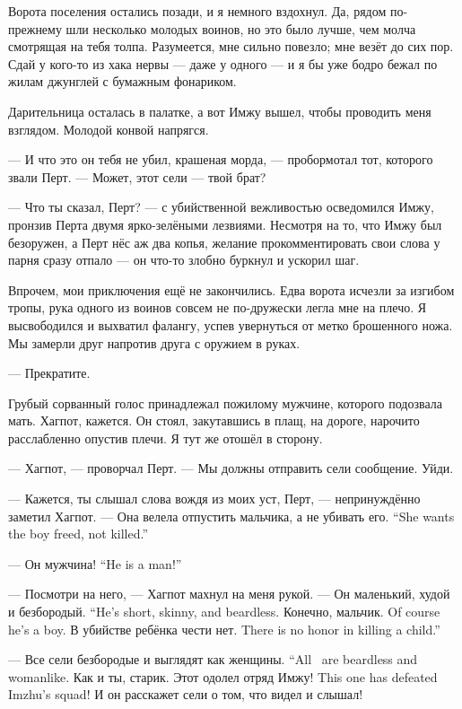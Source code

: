 Ворота поселения остались позади, и я немного вздохнул.
Да, рядом по-прежнему шли несколько молодых воинов, но это было лучше, чем молча смотрящая на тебя толпа.
Разумеется, мне сильно повезло;
мне везёт до сих пор.
Сдай у кого-то из хака нервы --- даже у одного --- и я бы уже бодро бежал по жилам джунглей с бумажным фонариком.

Дарительница осталась в палатке, а вот Имжу вышел, чтобы проводить меня взглядом.
Молодой конвой напрягся.

--- И что это он тебя не убил, крашеная морда, --- пробормотал тот, которого звали Перт.
--- Может, этот сели --- твой брат?

--- Что ты сказал, Перт? --- с убийственной вежливостью осведомился Имжу, пронзив Перта двумя ярко-зелёными лезвиями.
Несмотря на то, что Имжу был безоружен, а Перт нёс аж два копья, желание прокомментировать свои слова у парня сразу отпало --- он что-то злобно буркнул и ускорил шаг.

Впрочем, мои приключения ещё не закончились.
Едва ворота исчезли за изгибом тропы, рука одного из воинов совсем не по-дружески легла мне на плечо.
Я высвободился и выхватил фалангу, успев увернуться от метко брошенного ножа.
Мы замерли друг напротив друга с оружием в руках.

--- Прекратите.

Грубый сорванный голос принадлежал пожилому мужчине, которого подозвала мать.
Хагпот, кажется.
Он стоял, закутавшись в плащ, на дороге, нарочито расслабленно опустив плечи.
Я тут же отошёл в сторону.

--- Хагпот, --- проворчал Перт.
--- Мы должны отправить сели сообщение.
Уйди.

--- Кажется, ты слышал слова вождя из моих уст, Перт, --- непринуждённо заметил Хагпот.
{--- Она велела отпустить мальчика, а не убивать его.}
{``She wants the boy freed, not killed.''}

{--- Он мужчина!}
{``He is a man!''}

--- Посмотри на него, --- Хагпот махнул на меня рукой.
{--- Он маленький, худой и безбородый.}
{``He's short, skinny, and beardless.}
{Конечно, мальчик.}
{Of course he's a boy.}
{В убийстве ребёнка чести нет.}
{There is no honor in killing a child.''}

{--- Все сели безбородые и выглядят как женщины.}
{``All \Seli\ are beardless and womanlike.}
Как и ты, старик.
{Этот одолел отряд Имжу!}
{This one has defeated Imzhu's squad!}
И он расскажет сели о том, что видел и слышал!


